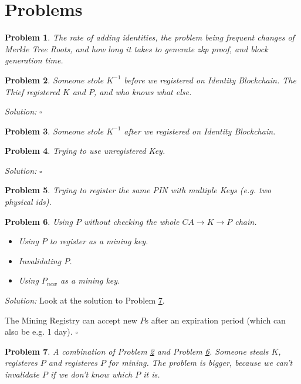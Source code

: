\documentclass{article}
\newtheorem{problem}{Problem}
\newenvironment{solution}
  {\emph{Solution:}}
  {\hfill $\square$}
\newcommand{\pbc}{\textit{Identity Blockchain}}
\begin{document}
\section{Problems}
\begin{problem}
  The rate of adding identities, the problem being frequent changes of Merkle Tree Roots, and how long it takes to generate zkp proof, and block generation time.
\end{problem}
\begin{problem}
\label{prob:bigsteal}
  Someone stole $K^{-1}$ before we registered on \pbc.
  The Thief registered $K$ and $P$, and who knows what else.
\end{problem}
\begin{solution}
\end{solution}
\begin{problem}
  Someone stole $K^{-1}$ after we registered on \pbc.
\end{problem}
\begin{problem}
Trying to use unregistered Key.
\end{problem}
\begin{solution}
\end{solution}
\begin{problem}
Trying to register the same PIN with multiple Keys (e.g. two physical ids).
\end{problem}
\begin{problem}
\label{prob:chain}
  Using $P$ without checking the whole $CA\rightarrow K\rightarrow P$ chain.
  \begin{itemize}
    \item Using $P$ to register as a mining key.
    \item Invalidating $P$.
    \item Using $P_{new}$ as a mining key.
  \end{itemize}
\end{problem}
\begin{solution}
  Look at the solution to Problem \ref{prob:miningKey}.

  The Mining Registry can accept new $P$s after an expiration period (which can also be e.g. 1 day).
\end{solution}
\begin{problem}
\label{prob:miningKey}
  A combination of Problem \ref{prob:bigsteal} and Problem \ref{prob:chain}.
  Someone steals $K$, registeres $P$ and registeres $P$ for mining.
  The problem is bigger, because we can't invalidate $P$ if we don't know which $P$ it is.
\end{problem}
\end{document}

